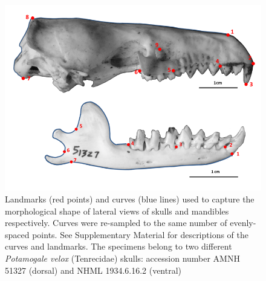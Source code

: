 \documentclass[12pt,a4paper]{article}
\begin{document}
	\begin{figure}[H]
	\centering
	\includegraphics[width=1\linewidth]{figures/SkLat+mands_landmark_diagrams.png}
	
	\caption[Diagrams of the landmarks and curves used for lateral views of skulls and mandibles]
		{Landmarks (red points) and curves (blue lines) used to capture the morphological shape of lateral views of skulls and mandibles respectively. Curves were re-sampled to the same number of evenly-spaced points. See Supplementary Material for descriptions of the curves and landmarks. The specimens belong to two different \textit{Potamogale velox} (Tenrecidae) skulls: accession number AMNH 51327 (dorsal) and NHML 1934.6.16.2 (ventral)}
	
	\label{fig:sklat_mands_landmarks}
	\end{figure}
%




\end{document}
